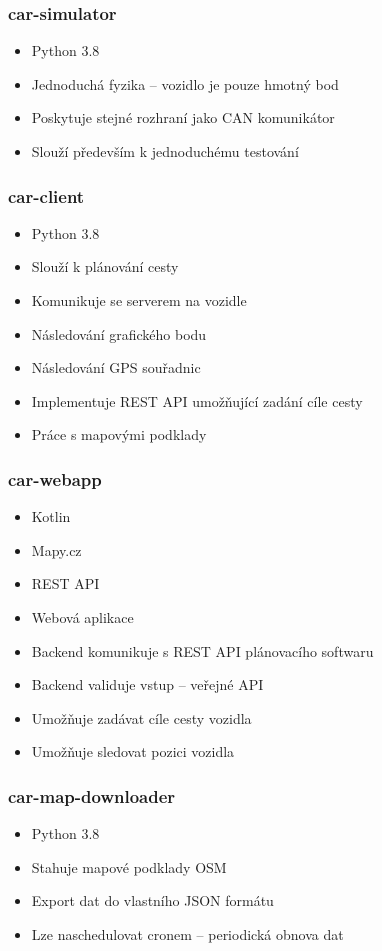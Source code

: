 \documentclass{beamer}
\begin{document}
\begin{frame}
    \frametitle{car-simulator}
    \begin{itemize}
        \item Python 3.8
        \item Jednoduchá fyzika -- vozidlo je pouze hmotný bod
        \item Poskytuje stejné rozhraní jako CAN komunikátor
        \item Slouží především k jednoduchému testování
    \end{itemize}
\end{frame}

\begin{frame}
    \frametitle{car-client}
    \begin{itemize}
        \item Python 3.8
        \item Slouží k plánování cesty
        \item Komunikuje se serverem na vozidle
        \item Následování grafického bodu
        \item Následování GPS souřadnic
        \item Implementuje REST API umožňující zadání cíle cesty
        \item Práce s mapovými podklady
    \end{itemize}
\end{frame}

\begin{frame}
    \frametitle{car-webapp}
    \begin{itemize}
        \item Kotlin
        \item Mapy.cz
        \item REST API
        \item Webová aplikace
        \item Backend komunikuje s REST API plánovacího softwaru
        \item Backend validuje vstup -- veřejné API
        \item Umožňuje zadávat cíle cesty vozidla
        \item Umožňuje sledovat pozici vozidla
    \end{itemize}
\end{frame}

\begin{frame}
    \frametitle{car-map-downloader}
    \begin{itemize}
        \item Python 3.8
        \item Stahuje mapové podklady OSM
        \item Export dat do vlastního JSON formátu
        \item Lze naschedulovat cronem -- periodická obnova dat
    \end{itemize}
\end{frame}
\end{document}
